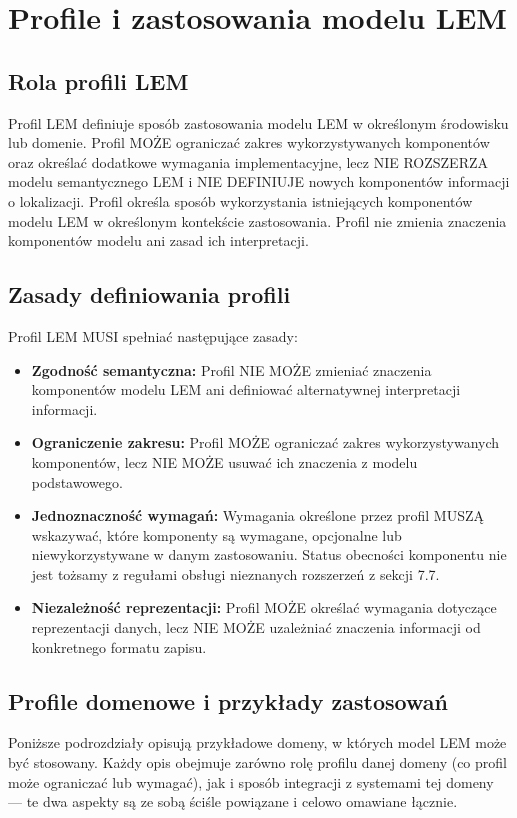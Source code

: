 
\chapter{Profile i zastosowania modelu LEM}
\label{chap:profile}

\section{Rola profili LEM}
Profil LEM definiuje sposób zastosowania modelu LEM w określonym środowisku lub domenie.
Profil MOŻE ograniczać zakres wykorzystywanych komponentów oraz określać dodatkowe wymagania implementacyjne, lecz NIE ROZSZERZA modelu semantycznego LEM i NIE DEFINIUJE nowych komponentów informacji o lokalizacji.
Profil określa sposób wykorzystania istniejących komponentów modelu LEM w określonym kontekście zastosowania. Profil nie zmienia znaczenia komponentów modelu ani zasad ich interpretacji.

\section{Zasady definiowania profili}
Profil LEM MUSI spełniać następujące zasady:

\begin{itemize}
    \item \textbf{Zgodność semantyczna:} Profil NIE MOŻE zmieniać znaczenia komponentów modelu LEM ani definiować alternatywnej interpretacji informacji.
    \item \textbf{Ograniczenie zakresu:} Profil MOŻE ograniczać zakres wykorzystywanych komponentów, lecz NIE MOŻE usuwać ich znaczenia z modelu podstawowego.
    \item \textbf{Jednoznaczność wymagań:} Wymagania określone przez profil MUSZĄ wskazywać, które komponenty są wymagane, opcjonalne lub niewykorzystywane w danym zastosowaniu. Status obecności komponentu nie jest tożsamy z regułami obsługi nieznanych rozszerzeń z sekcji 7.7.
    \item \textbf{Niezależność reprezentacji:} Profil MOŻE określać wymagania dotyczące reprezentacji danych, lecz NIE MOŻE uzależniać znaczenia informacji od konkretnego formatu zapisu.
\end{itemize}

\section{Profile domenowe i przykłady zastosowań}
Poniższe podrozdziały opisują przykładowe domeny, w których model LEM może być stosowany. Każdy opis obejmuje zarówno rolę profilu danej domeny (co profil może ograniczać lub wymagać), jak i sposób integracji z systemami tej domeny — te dwa aspekty są ze sobą ściśle powiązane i celowo omawiane łącznie.


